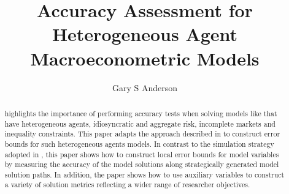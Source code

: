 \documentclass[14pt]{article}
\author{Gary S Anderson}
\title{Accuracy Assessment for Heterogeneous Agent Macroeconometric Models}
\begin{document}
\maketitle

\begin{abstract}

  \cite{RePEc:eee:dyncon:v:34:y:2010:i:1:p:4-27} highlights the importance of
  performing
  accuracy tests when solving models like \cite{krusell98} that have
 heterogeneous agents, idiosyncratic and aggregate risk,
  incomplete markets and inequality constraints.
  This paper adapts the approach described in 
  \cite{RePEc:fip:fedgfe:2018-70}
to construct error bounds for such heterogeneous agents models.
In contrast to the simulation strategy adopted
in \cite{RePEc:eee:dyncon:v:34:y:2010:i:1:p:4-27}, this paper shows how to
construct local error bounds for model variables by measuring 
the accuracy of the model solutions along
strategically generated model solution paths.  In addition,
the paper shows how to
use auxiliary variables to construct a variety of solution metrics
reflecting a wider range of researcher objectives.

\end{abstract}




\end{document}
